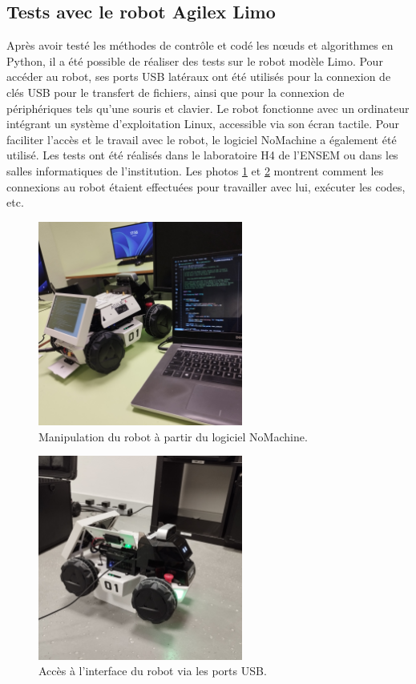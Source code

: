 \subsection{Tests avec le robot Agilex Limo}

Après avoir testé les méthodes de contrôle et codé les nœuds et algorithmes en Python, il a été possible de réaliser des tests sur le robot modèle Limo. Pour accéder au robot, ses ports USB latéraux ont été utilisés pour la connexion de clés USB pour le transfert de fichiers, ainsi que pour la connexion de périphériques tels qu'une souris et clavier. Le robot fonctionne avec un ordinateur intégrant un système d'exploitation Linux, accessible via son écran tactile. Pour faciliter l'accès et le travail avec le robot, le logiciel NoMachine \cite{NoMachine} a également été utilisé. Les tests ont été réalisés dans le laboratoire H4 de l'ENSEM ou dans les salles informatiques de l'institution. Les photos \ref{img:code} et \ref{img:acess} montrent comment les connexions au robot étaient effectuées pour travailler avec lui, exécuter les codes, etc.

\begin{figure}[!h]
    \centering
    \includegraphics[width=0.6\textwidth]{img/agilex/code.jpg} 
    \caption{Manipulation du robot à partir du logiciel NoMachine.}
    \label{img:code}
\end{figure}
\FloatBarrier


\begin{figure}[!h]
    \centering
    \includegraphics[width=0.6\textwidth]{img/agilex/acess.jpg} 
    \caption{Accès à l'interface du robot via les ports USB.}
    \label{img:acess}
\end{figure}
\FloatBarrier

